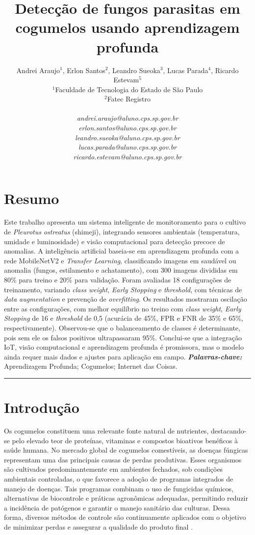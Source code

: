\documentclass[11pt,a4paper]{article}
\title{\vspace{0.6cm}\textbf{\Large Detecção de fungos parasitas em cogumelos usando aprendizagem profunda}}
\author{
    Andrei Araujo$^{1}$, Erlon Santos$^{2}$, Leandro Sueoka$^{3}$, Lucas Parada$^{4}$, Ricardo Estevam$^{5}$ \\[0.3cm]
    \small
    $^{1}$Faculdade de Tecnologia do Estado de São Paulo \\
    $^{2}$Fatec Registro \\[0.2cm]
    \begin{tabular}{c}
        \textit{andrei.araujo@aluno.cps.sp.gov.br} \\
        \textit{erlon.santos@aluno.cps.sp.gov.br} \\
        \textit{leandro.sueoka@aluno.cps.sp.gov.br} \\
        \textit{lucas.parada@aluno.cps.sp.gov.br} \\
        \textit{ricardo.estevam@aluno.cps.sp.gov.br}
    \end{tabular}
}
\date{}
\begin{document}
\pagestyle{fancy}

\maketitle
\thispagestyle{fancy}

\section*{Resumo}

\lipsum[0]Este trabalho apresenta um sistema inteligente de monitoramento para o cultivo de \textit{Pleurotus ostreatus} (shimeji), integrando sensores ambientais (temperatura, umidade e luminosidade) e visão computacional para detecção precoce de anomalias. A inteligência artificial baseia-se em aprendizagem profunda com a rede MobileNetV2 e \textit{Transfer Learning}, classificando imagens em saudável ou anomalia (fungos, estilamento e achatamento), com 300 imagens divididas em 80\% para treino e 20\% para validação. Foram avaliadas 18 configurações de treinamento, variando \textit{class weight}, \textit{Early Stopping} e \textit{threshold}, com técnicas de \textit{data augmentation} e prevenção de \textit{overfitting}. Os resultados mostraram oscilação entre as configurações, com melhor equilíbrio no treino com \textit{class weight}, \textit{Early Stopping} de 16 e \textit{threshold} de 0,5 (acurácia de 45\%, FPR e FNR de 35\% e 65\%, respectivamente). Observou-se que o balanceamento de classes é determinante, pois sem ele os falsos positivos ultrapassaram 95\%. Conclui-se que a integração IoT, visão computacional e aprendizagem profunda é promissora, mas o modelo ainda requer mais dados e ajustes para aplicação em campo.
\vspace{0.3cm}
\noindent\textit{\textbf{Palavras-chave:}}  Aprendizagem Profunda; Cogumelos; Internet das Coisas.

\vspace{0.5cm}
\noindent\rule{\textwidth}{0.5pt}
\vspace{0.5cm}

\section{Introdução}

Os cogumelos constituem uma relevante fonte natural de nutrientes, destacando-se pelo elevado teor de proteínas, vitaminas e compostos bioativos benéficos à saúde humana. No mercado global de cogumelos comestíveis, as doenças fúngicas representam uma das principais causas de perdas produtivas. Esses organismos são cultivados predominantemente em ambientes fechados, sob condições ambientais controladas, o que favorece a adoção de programas integrados de manejo de doenças. Tais programas combinam o uso de fungicidas químicos, alternativas de biocontrole e práticas agronômicas adequadas, permitindo reduzir a incidência de patógenos e garantir o manejo sanitário das culturas. Dessa forma, diversos métodos de controle são continuamente aplicados com o objetivo de minimizar perdas e assegurar a qualidade do produto final \cite{Bellettini2017}.
\end{document}
